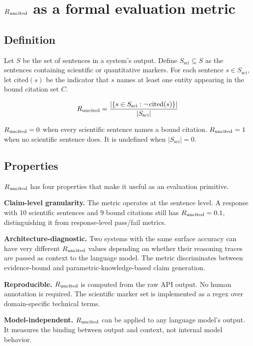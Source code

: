 \section{$R_{\mathrm{uncited}}$ as a formal evaluation metric}

\subsection{Definition}

Let $S$ be the set of sentences in a system's output. Define $S_\mathrm{sci} \subseteq S$ as the
sentences containing scientific or quantitative markers. For each sentence $s \in S_\mathrm{sci}$,
let $\mathrm{cited}(s)$ be the indicator that $s$ names at least one entity appearing in the bound
citation set $C$.

\begin{equation}
\label{eq:runcited}
R_{\mathrm{uncited}} = \frac{|\{ s \in S_\mathrm{sci} : \neg\,\mathrm{cited}(s) \}|}{|S_\mathrm{sci}|}
\end{equation}

$R_{\mathrm{uncited}} = 0$ when every scientific sentence names a bound citation. $R_{\mathrm{uncited}} = 1$ when no
scientific sentence does. It is undefined when $|S_\mathrm{sci}| = 0$.

\subsection{Properties}

$R_{\mathrm{uncited}}$ has four properties that make it useful as an evaluation primitive.

\textbf{Claim-level granularity.} The metric operates at the sentence level. A response with 10
scientific sentences and 9 bound citations still has $R_{\mathrm{uncited}} = 0.1$, distinguishing it from
response-level pass/fail metrics.

\textbf{Architecture-diagnostic.} Two systems with the same surface accuracy can have very different
$R_{\mathrm{uncited}}$ values depending on whether their reasoning traces are passed as context to the language
model. The metric discriminates between evidence-bound and parametric-knowledge-based claim generation.

\textbf{Reproducible.} $R_{\mathrm{uncited}}$ is computed from the raw API output. No human annotation is
required. The scientific marker set is implemented as a regex over domain-specific technical terms.

\textbf{Model-independent.} $R_{\mathrm{uncited}}$ can be applied to any language model's output. It measures
the binding between output and context, not internal model behavior.

